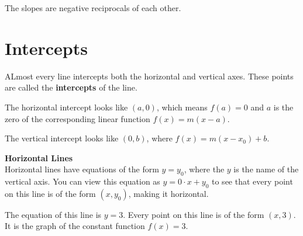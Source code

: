 \documentclass{ximera}
\begin{document}
The slopes are negative reciprocals of each other.



















\section{Intercepts}


ALmost every line intercepts both the horizontal and vertical axes.  These points are called the \textbf{intercepts} of the line.  

The horizontal intercept looks like $(a, 0)$, which means $f(a)=0$ and $a$ is the zero of the corresponding linear function $f(x) = m (x-a)$.

The vertical intercept looks like $(0, b)$, where $f(x) = m(x-x_0)+b$.





\textbf{Horizontal Lines} \\
Horizontal lines have equations of the form $y = y_0$, where the $y$ is the name of the vertical axis. You can view this equation as $y = 0 \cdot x + y_0$ to see that every point on this line is of the form $(x, y_0)$, making it horizontal.





\begin{example}

\begin{image}
\end{image}

The equation of this line is $y=3$.  Every point on this line is of the form $(x, 3)$. It is the graph of the constant function $f(x)=3$.


\end{example}
\end{document}
